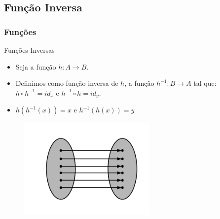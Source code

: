 \documentclass{beamer}
\begin{document}
\subsection{Função Inversa}
\begin{frame}
\frametitle{Funções}

	\begin{block}{Funções Inversas}
		\begin{itemize}
			\item Seja a função $h : A \to B$.
			\item Definimos como função inversa de $h$, a função $h^{-1}: B \to A$ tal que: $ h \circ h^{-1} = id_x$ e $ h^{-1} \circ h = id_y$.
			\item $h(h^{-1}(x)) = x$ e $h^{-1}(h(x)) = y$
		\end{itemize}
	\end{block}
	
	\begin{figure}[!h]
			\begin{center}
			\includegraphics[width=0.6\textwidth]{Figures/inversa}
			\end{center}
	\end{figure}

\end{frame}

\end{document}
